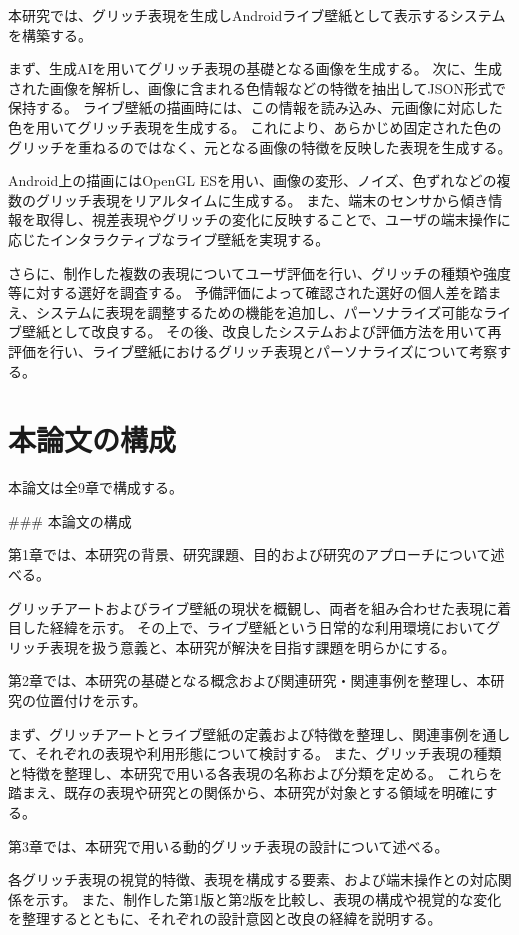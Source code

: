 本研究では、グリッチ表現を生成しAndroidライブ壁紙として表示するシステムを構築する。

まず、生成AIを用いてグリッチ表現の基礎となる画像を生成する。
次に、生成された画像を解析し、画像に含まれる色情報などの特徴を抽出してJSON形式で保持する。
ライブ壁紙の描画時には、この情報を読み込み、元画像に対応した色を用いてグリッチ表現を生成する。
これにより、あらかじめ固定された色のグリッチを重ねるのではなく、元となる画像の特徴を反映した表現を生成する。

Android上の描画にはOpenGL ESを用い、画像の変形、ノイズ、色ずれなどの複数のグリッチ表現をリアルタイムに生成する。
また、端末のセンサから傾き情報を取得し、視差表現やグリッチの変化に反映することで、ユーザの端末操作に応じたインタラクティブなライブ壁紙を実現する。

さらに、制作した複数の表現についてユーザ評価を行い、グリッチの種類や強度等に対する選好を調査する。
予備評価によって確認された選好の個人差を踏まえ、システムに表現を調整するための機能を追加し、パーソナライズ可能なライブ壁紙として改良する。
その後、改良したシステムおよび評価方法を用いて再評価を行い、ライブ壁紙におけるグリッチ表現とパーソナライズについて考察する。


\section{本論文の構成}

本論文は全9章で構成する。

### 本論文の構成

第1章では、本研究の背景、研究課題、目的および研究のアプローチについて述べる。

グリッチアートおよびライブ壁紙の現状を概観し、両者を組み合わせた表現に着目した経緯を示す。
その上で、ライブ壁紙という日常的な利用環境においてグリッチ表現を扱う意義と、本研究が解決を目指す課題を明らかにする。


第2章では、本研究の基礎となる概念および関連研究・関連事例を整理し、本研究の位置付けを示す。

まず、グリッチアートとライブ壁紙の定義および特徴を整理し、関連事例を通して、それぞれの表現や利用形態について検討する。
また、グリッチ表現の種類と特徴を整理し、本研究で用いる各表現の名称および分類を定める。
これらを踏まえ、既存の表現や研究との関係から、本研究が対象とする領域を明確にする。


第3章では、本研究で用いる動的グリッチ表現の設計について述べる。

各グリッチ表現の視覚的特徴、表現を構成する要素、および端末操作との対応関係を示す。
また、制作した第1版と第2版を比較し、表現の構成や視覚的な変化を整理するとともに、それぞれの設計意図と改良の経緯を説明する。


